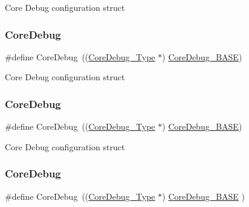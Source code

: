 Core Debug configuration struct \mbox{\label{group___c_m_s_i_s__core__base_gab6e30a2b802d9021619dbb0be7f5d63d}} 
\subsubsection{\texorpdfstring{Core\+Debug}{CoreDebug}\hspace{0.1cm}{\footnotesize\ttfamily [5/8]}}
{\footnotesize\ttfamily \#define Core\+Debug~((\hyperlink{struct_core_debug___type}{Core\+Debug\+\_\+\+Type} $\ast$)     \hyperlink{group___c_m_s_i_s__core__base_ga680604dbcda9e9b31a1639fcffe5230b}{Core\+Debug\+\_\+\+B\+A\+SE})}

Core Debug configuration struct \mbox{\label{group___c_m_s_i_s__core__base_gab6e30a2b802d9021619dbb0be7f5d63d}} 
\subsubsection{\texorpdfstring{Core\+Debug}{CoreDebug}\hspace{0.1cm}{\footnotesize\ttfamily [6/8]}}
{\footnotesize\ttfamily \#define Core\+Debug~((\hyperlink{struct_core_debug___type}{Core\+Debug\+\_\+\+Type} $\ast$)     \hyperlink{group___c_m_s_i_s__core__base_ga680604dbcda9e9b31a1639fcffe5230b}{Core\+Debug\+\_\+\+B\+A\+SE})}

Core Debug configuration struct \mbox{\label{group___c_m_s_i_s__core__base_gab6e30a2b802d9021619dbb0be7f5d63d}} 
\subsubsection{\texorpdfstring{Core\+Debug}{CoreDebug}\hspace{0.1cm}{\footnotesize\ttfamily [7/8]}}
{\footnotesize\ttfamily \#define Core\+Debug~((\hyperlink{struct_core_debug___type}{Core\+Debug\+\_\+\+Type} $\ast$)     \hyperlink{group___c_m_s_i_s__core__base_ga680604dbcda9e9b31a1639fcffe5230b}{Core\+Debug\+\_\+\+B\+A\+SE}   )}

